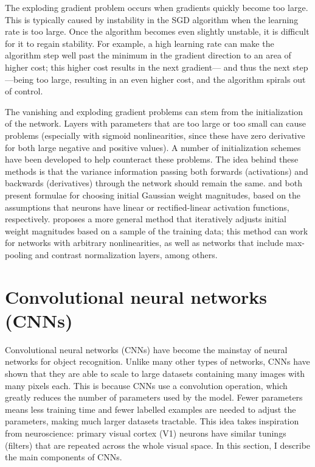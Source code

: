 The exploding gradient problem occurs when gradients quickly become too large.
This is typically caused by instability in the SGD algorithm
when the learning rate is too large.
Once the algorithm becomes even slightly unstable,
it is difficult for it to regain stability.
For example, a high learning rate can make the algorithm
step well past the minimum in the gradient direction to an area of higher cost;
this higher cost results in the next gradient---%
and thus the next step---being too large,
resulting in an even higher cost, and the algorithm spirals out of control.

The vanishing and exploding gradient problems can stem from
the initialization of the network.
Layers with parameters that are too large or too small can cause problems
(especially with sigmoid nonlinearities, since these have zero derivative
for both large negative and positive values).
A number of initialization schemes have been developed to help counteract these problems.
The idea behind these methods is that the variance information passing both
forwards (activations) and backwards (derivatives) through the network
should remain the same.
\textcite{Glorot2010} and \textcite{He2015} both present formulae
for choosing initial Gaussian weight magnitudes,
based on the assumptions that neurons have linear or rectified-linear activation functions,
respectively.
\textcite{Mishkin2016} proposes a more general method
that iteratively adjusts initial weight magnitudes
based on a sample of the training data;
this method can work for networks with arbitrary nonlinearities,
as well as networks that include max-pooling and contrast normalization layers,
among others.


\section{Convolutional neural networks (CNNs)}

Convolutional neural networks (CNNs) have become the mainstay
of neural networks for object recognition.
Unlike many other types of networks,
CNNs have shown that they are able to scale to large datasets containing
many images with many pixels each.
This is because CNNs use a convolution operation,
which greatly reduces the number of parameters used by the model.
Fewer parameters means less training time and fewer labelled examples
are needed to adjust the parameters,
making much larger datasets tractable.
This idea takes inspiration from neuroscience:
primary visual cortex (V1) neurons have similar tunings (filters)
that are repeated across the whole visual space.
In this section, I describe the main components of CNNs.


